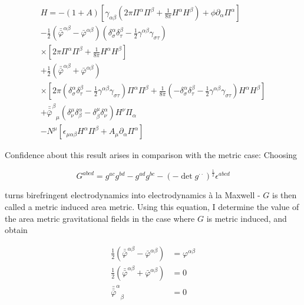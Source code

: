 \documentclass[11pt]{article}
\begin{document}
\begin{equation} \label{geld_pert_ham}
	\begin{split}
		H = 
		- \left( 1 + A \right) 
		\left[
		\gamma_{\alpha \beta}
		\left( 
		2 \pi \Pi^\alpha \Pi^\beta
		+ \frac{1}{8 \pi} H^\alpha H^\beta 
		\right)
		+ \phi \partial_\alpha \Pi^\alpha
		\right] \\
		- \frac{1}{2} \left( 
		\bar{\bar{\varphi}}^{\alpha \beta} 
		- \bar{\varphi}^{\alpha \beta}
		\right)
		 \left( 
		 \delta^\alpha_\sigma \delta^\beta_\tau 
		- \frac{1}{2} \gamma^{\alpha \beta } \gamma_{\sigma \tau} 
		\right) \\
		\times \left[
		2 \pi 
		\Pi^\alpha \Pi^\beta
		+ \frac{1}{8 \pi} 
		H^\alpha H^\beta 
		\right] \\
		+ \frac{1}{2} \left( 
		\bar{\bar{\varphi}}^{\alpha \beta} 
		+ \bar{\varphi}^{\alpha \beta}
		\right) \\
		\times \left[
		2 \pi 
		\left( 
		\delta^\alpha_\sigma \delta^\beta_\tau 
		- \frac{1}{2} \gamma^{\alpha \beta } \gamma_{\sigma \tau} 
		\right)
		\Pi^\alpha \Pi^\beta
		+ \frac{1}{8 \pi} 
		 \left( 
		- \delta^\alpha_\sigma \delta^\beta_\tau 
		- \frac{1}{2} \gamma^{\alpha \beta } \gamma_{\sigma \tau} 
		\right)
		H^\alpha H^\beta 
		\right] \\
		+ {\bar{\bar{\bar{\varphi}}}^\beta}_\mu 
		\left(
		\delta^{\mu}_\nu \delta^\alpha_\beta 
		- \delta^{\mu}_\beta \delta^\alpha_\nu
		\right) H^\nu \Pi_\alpha \\
		- N^\mu
		\left[
		\epsilon_{\mu \alpha \beta} H^\alpha \Pi^\beta
		+ A_\mu \partial_\alpha \Pi^\alpha
		\right]
	\end{split}
\end{equation}

Confidence about this result arises in comparison with the metric case: Choosing

\begin{equation}
	G^{a b c d} = 
	g^{a c} g^{b d} - g^{a d}g^{b c} 
	- \left(
	-\det{g^{\cdot \cdot}}
	\right) ^{\frac{1}{2}}
	\epsilon^{ a b c d}
\end{equation}

turns birefringent electrodynamics into electrodynamics à la Maxwell - $G$ is then called a metric induced area metric. Using this equation, I determine the value of the area metric gravitational fields in the case where $G$ is metric induced, and obtain

\begin{align}
	\frac{1}{2} 
	\left( 
	\bar{\bar{\varphi}}^{\alpha \beta} 
	- \bar{\varphi}^{\alpha \beta}
	\right) 
	&= \varphi^{\alpha \beta}\\
	\frac{1}{2} 
	\left( 
	\bar{\bar{\varphi}}^{\alpha \beta} 
	+ \bar{\varphi}^{\alpha \beta}
	\right) 
	&= 0 \\
	{\bar{\bar{\bar{\varphi}}}^\alpha}_\beta 
	&= 0
\end{align}
\end{document}
